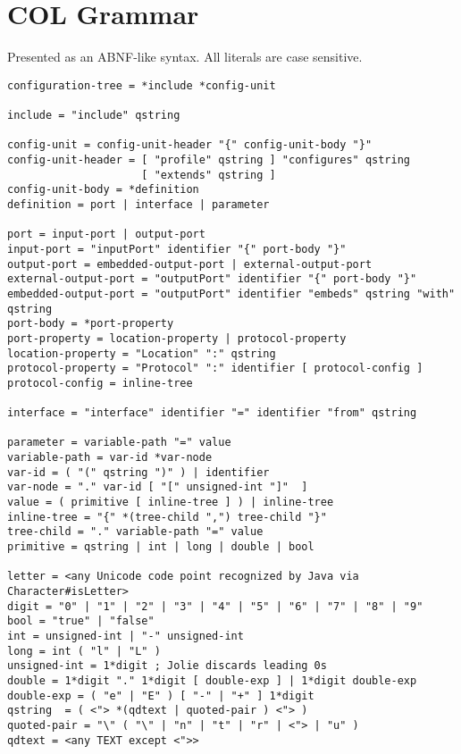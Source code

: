\section{COL Grammar}\label{package-specification}

Presented as an ABNF-like syntax. All literals are case sensitive.

\begin{verbatim}
configuration-tree = *include *config-unit

include = "include" qstring

config-unit = config-unit-header "{" config-unit-body "}"
config-unit-header = [ "profile" qstring ] "configures" qstring 
                     [ "extends" qstring ]
config-unit-body = *definition
definition = port | interface | parameter

port = input-port | output-port
input-port = "inputPort" identifier "{" port-body "}"
output-port = embedded-output-port | external-output-port
external-output-port = "outputPort" identifier "{" port-body "}"
embedded-output-port = "outputPort" identifier "embeds" qstring "with" qstring
port-body = *port-property
port-property = location-property | protocol-property
location-property = "Location" ":" qstring
protocol-property = "Protocol" ":" identifier [ protocol-config ]
protocol-config = inline-tree

interface = "interface" identifier "=" identifier "from" qstring

parameter = variable-path "=" value
variable-path = var-id *var-node
var-id = ( "(" qstring ")" ) | identifier
var-node = "." var-id [ "[" unsigned-int "]"  ]
value = ( primitive [ inline-tree ] ) | inline-tree
inline-tree = "{" *(tree-child ",") tree-child "}"
tree-child = "." variable-path "=" value
primitive = qstring | int | long | double | bool

letter = <any Unicode code point recognized by Java via Character#isLetter>
digit = "0" | "1" | "2" | "3" | "4" | "5" | "6" | "7" | "8" | "9"
bool = "true" | "false"
int = unsigned-int | "-" unsigned-int
long = int ( "l" | "L" )
unsigned-int = 1*digit ; Jolie discards leading 0s
double = 1*digit "." 1*digit [ double-exp ] | 1*digit double-exp
double-exp = ( "e" | "E" ) [ "-" | "+" ] 1*digit
qstring  = ( <"> *(qdtext | quoted-pair ) <"> )
quoted-pair = "\" ( "\" | "n" | "t" | "r" | <"> | "u" )
qdtext = <any TEXT except <">>
\end{verbatim}
